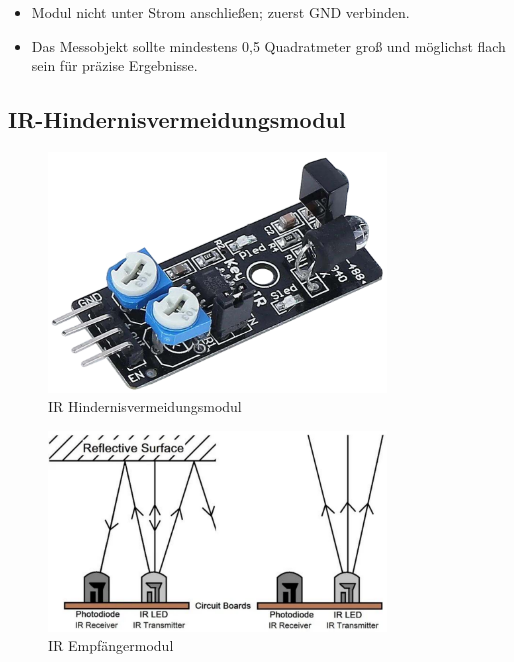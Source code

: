 \documentclass{vorlage-design-main}
\begin{document}
\begin{itemize}
  \begin{itemize}
  
  \item
    Modul nicht unter Strom anschließen; zuerst GND verbinden.
  \item
    Das Messobjekt sollte mindestens 0,5 Quadratmeter groß und möglichst
    flach sein für präzise Ergebnisse.
  \end{itemize}
\end{itemize}

\hypertarget{ir-hindernisvermeidungsmodul}{%
\subsection{IR-Hindernisvermeidungsmodul}\label{ir-hindernisvermeidungsmodul}}

\begin{figure}
\centering
\includegraphics[width=0.8\textwidth]{images/ir_avoid.pdf}
\floatnotes{}
\caption{IR Hindernisvermeidungsmodul}
\end{figure}

\begin{figure}
\centering
\includegraphics[width=0.8\textwidth]{images/ir_receive.pdf}
\floatnotes{}
\caption{IR Empfängermodul}
\end{figure}
\end{document}
